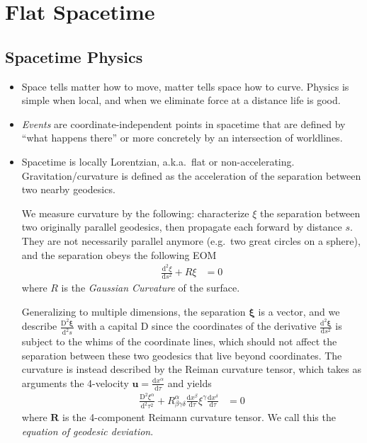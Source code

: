 \documentclass[12pt]{report}
\newcommand{\rd}[2]{\frac{\mathrm{d}#1}{\mathrm{d}#2}}
\newcommand{\rtd}[2]{\frac{\mathrm{d}^2#1}{\mathrm{d}#2^2}}
\begin{document}
\onehalfspacing

\pagestyle{fancy}
\cfoot{\thepage/\pageref{LastPage}}

\tableofcontents

\chapter{Flat Spacetime}

\section{Spacetime Physics}

\begin{itemize}
    \item Space tells matter how to move, matter tells space how to curve.
        Physics is simple when local, and when we eliminate force at a distance
        life is good.

    \item \emph{Events} are coordinate-independent points in spacetime that are
        defined by ``what happens there'' or more concretely by an intersection
        of worldlines.

    \item Spacetime is locally Lorentzian, a.k.a.\ flat or non-accelerating.
        Gravitation/curvature is defined as the acceleration of the separation
        between two nearby geodesics.

        We measure curvature by the following: characterize $\xi$ the separation
        between two originally parallel geodesics, then propagate each forward
        by distance $s$. They are not necessarily parallel anymore (e.g.\ two
        great circles on a sphere), and the separation obeys the following EOM
        \begin{align}
            \rtd{\xi}{s} + R\xi &= 0
        \end{align}
        where $R$ is the \emph{Gaussian Curvature} of the surface.

        Generalizing to multiple dimensions, the separation $\mathbf{\xi}$ is a
        vector, and we describe $\frac{\mathrm{D}^2\mathbf{\xi}}{\mathrm{d}^2s}$
        with a capital $\mathrm{D}$ since the coordinates of the derivative
        $\rtd{\mathbf{\xi}}{s}$ is subject to the whims of the coordinate lines,
        which should not affect the separation between these two geodesics that
        live beyond coordinates. The curvature is instead described by the
        Reiman curvature tensor, which takes as arguments the 4-velocity
        $\mathbf{u} = \rd{x^\alpha}{\tau}$ and yields
        \begin{align}
            \frac{\mathrm{D}^2\xi^\alpha}{\mathrm{d}^2\tau^2} +
                R^{\alpha}_{\beta\gamma\delta}
                \rd{x^\beta}{\tau}\xi^\gamma \rd{x^\delta}{\tau} &= 0
        \end{align}
        where $\mathbf{R}$ is the 4-component Reimann curvature tensor. We call
        this the \emph{equation of geodesic deviation}.


\end{itemize}
\end{document}
